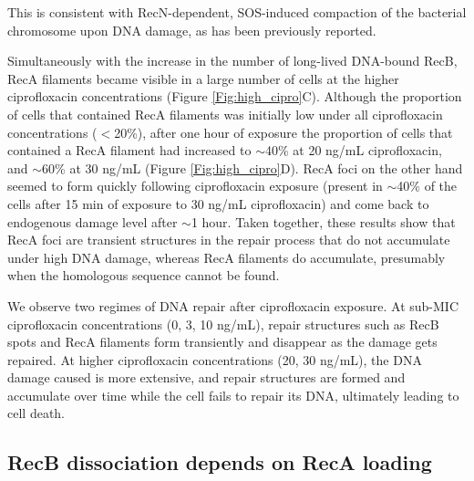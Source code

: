 This is consistent with RecN-dependent, SOS-induced compaction of the bacterial chromosome upon DNA damage, as has been previously reported\cite{Odsbu2014}.

Simultaneously with the increase in the number of long-lived DNA-bound RecB, RecA filaments became visible in a large number of cells at the higher ciprofloxacin concentrations (Figure \ref{Fig:high_cipro}C). Although the proportion of cells that contained RecA filaments was initially low under all ciprofloxacin concentrations ($<$20\%), after one hour of exposure the proportion of cells that contained a RecA filament had increased to $\sim$40\% at 20 ng/mL ciprofloxacin, and $\sim$60\% at 30 ng/mL (Figure \ref{Fig:high_cipro}D). RecA foci on the other hand seemed to form quickly following ciprofloxacin exposure (present in $\sim$40\% of the cells after 15 min of exposure to 30 ng/mL ciprofloxacin) and come back to endogenous damage level after $\sim$1 hour. Taken together, these results show that RecA foci are transient structures in the repair process that do not accumulate under high DNA damage, whereas RecA filaments do accumulate, presumably when the homologous sequence cannot be found.

We observe two regimes of DNA repair after ciprofloxacin exposure. At sub-MIC ciprofloxacin concentrations (0, 3, 10 ng/mL), repair structures such as RecB spots and RecA filaments form transiently and disappear as the damage gets repaired. At higher ciprofloxacin concentrations (20, 30 ng/mL), the DNA damage caused is more extensive, and repair structures are formed and accumulate over time while the cell fails to repair its DNA, ultimately leading to cell death.


\subsection*{RecB dissociation depends on RecA loading}

